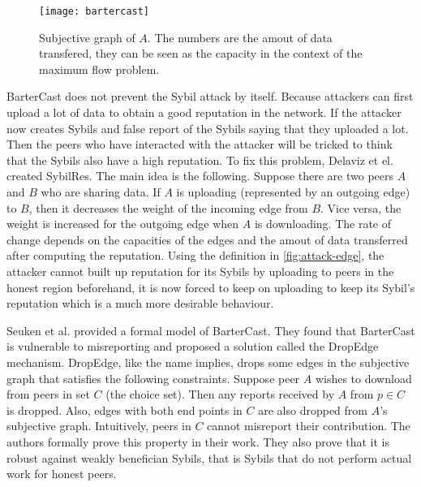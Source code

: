 \begin{figure}
  \centering
  \texttt{[image: bartercast]}
  \caption{Subjective graph of $A$. The numbers are the amout of data transfered,
    they can be seen as the capacity in the context of the maximum flow
    problem.}
  \label{fig:bartercast}
\end{figure}

BarterCast does not prevent the Sybil attack by itself. Because attackers can
first upload a lot of data to obtain a good reputation in the network. If the
attacker now creates Sybils and false report of the Sybils saying that they
uploaded a lot. Then the peers who have interacted with the attacker will be
tricked to think that the Sybils also have a high reputation. To fix this
problem, Delaviz et el. created SybilRes\cite{delaviz2012sybilres}. The main
idea is the following. Suppose there are two peers $A$ and $B$ who are sharing
data. If $A$ is uploading (represented by an outgoing edge) to $B$, then it
decreases the weight of the incoming edge from $B$. Vice versa, the weight is
increased for the outgoing edge when $A$ is downloading. The rate of change
depends on the capacities of the edges and the amout of data transferred after
computing the reputation. Using the definition in \autoref{fig:attack-edge}, the
attacker cannot built up reputation for its Sybils by uploading to peers in the
honest region beforehand, it is now forced to keep on uploading to keep its
Sybil's reputation which is a much more desirable behaviour.

Seuken et al. provided a formal model of BarterCast. They found that BarterCast
is vulnerable to misreporting and proposed a solution called the DropEdge
mechanism\cite{seuken2011sybil, seuken2014sybil}. DropEdge, like the name
implies, drops some edges in the subjective graph that satisfies the following
constraints. Suppose peer $A$ wishes to download from peers in set $C$ (the
choice set). Then any reports received by $A$ from $p \in C$ is dropped. Also,
edges with both end points in $C$ are also dropped from $A$'s subjective graph.
Intuitively, peers in $C$ cannot misreport their contribution. The authors
formally prove this property in their work. They also prove that it is robust
against weakly benefician Sybils, that is Sybils that do not perform actual work
for honest peers.

